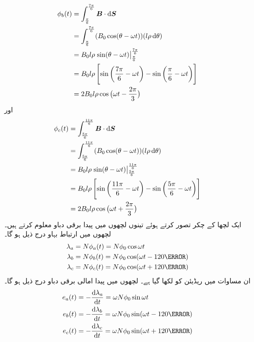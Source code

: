 \begin{gather}
\begin{aligned}
\phi_b(t)&=\int_{\frac{\pi}{6}}^{\frac{7\pi}{6}} \kvec{B} \cdot \dif \kvec{S}\\
&=\int_{\frac{\pi}{6}}^{\frac{7\pi}{6}} (B_0 \cos (\theta-\omega t))(l \rho \dif \theta)\\
&=B_0 l \rho \left. \sin (\theta-\omega t) \right\vert_{\frac{\pi}{6}}^{\frac{7\pi}{6}}\\
&=B_0 l \rho \left[\sin \left(\frac{7\pi}{6}-\omega t \right )-\sin \left (\frac{\pi}{6}-\omega t \right) \right]\\
&=2 B_0 l \rho \cos \big(\omega t-\frac{2\pi}{3}\big)
\end{aligned}
\end{gather}
اور
\begin{gather}
\begin{aligned}
\phi_c(t)&=\int_{\frac{5\pi}{6}}^{\frac{11\pi}{6}} \kvec{B} \cdot \dif \kvec{S}\\
&=\int_{\frac{5\pi}{6}}^{\frac{11\pi}{6}} (B_0 \cos (\theta-\omega t))(l \rho \dif \theta)\\
&=B_0 l \rho \left. \sin (\theta-\omega t) \right\vert_{\frac{5\pi}{6}}^{\frac{11\pi}{6}}\\
&=B_0 l \rho \left[\sin \left(\frac{11\pi}{6}-\omega t \right )-\sin \left (\frac{5\pi}{6}-\omega t \right) \right]\\
&=2 B_0 l \rho \cos \big(\omega t+\frac{2\pi}{3}\big)
\end{aligned}
\end{gather}
ایک لچھا کے  چکر تصور کرتے ہوئے تینوں لچھوں میں پیدا برقی دباو معلوم کرتے ہیں۔لچھوں میں ارتباط بہاو درج ذیل ہو گا۔
\begin{gather}
\begin{aligned}
\lambda_a&=N \phi_a (t)=N \phi_0 \cos \omega t\\
\lambda_b&=N \phi_b (t)=N \phi_0 \cos (\omega t-120\degree)\\
\lambda_c&=N \phi_c (t)=N \phi_0 \cos (\omega t+120\degree)
\end{aligned}
\end{gather}
ان مساوات میں  ریڈیئن کو  لکھا گیا ہے۔ لچھوں میں پیدا امالی برقی دباو درج ذیل ہو گا۔
\begin{gather}
\begin{aligned}\label{مساوات_گھومتے_مشین_تین_دور_سائن_نما_برقی_دباو_الف}
e_a(t)&=-\frac{\dif \lambda_a}{\dif t}=\omega N \phi_0 \sin \omega t\\
e_b(t)&=-\frac{\dif \lambda_b}{\dif t}=\omega N \phi_0 \sin (\omega t-120\degree)\\
e_c(t)&=-\frac{\dif \lambda_c}{\dif t}=\omega N \phi_0 \sin (\omega t+120\degree)
\end{aligned}
\end{gather}
